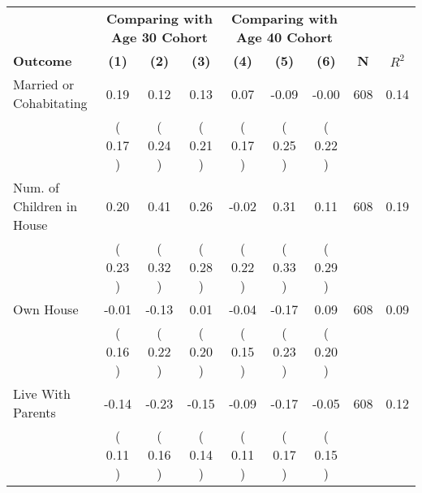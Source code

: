 \begin{tabular}{lcccccccc}
\toprule
 & \multicolumn{3}{c}{\textbf{Comparing with Age 30 Cohort}} & \multicolumn{3}{c}{\textbf{Comparing with Age 40 Cohort}} & \\
\cmidrule(lr){2-4} \cmidrule(lr){5-7} 
 \textbf{Outcome} & \textbf{(1)} & \textbf{(2)} & \textbf{(3)} & \textbf{(4)} & \textbf{(5)} & \textbf{(6)} & \textbf{N} & \textbf{$ R^2$} \\
\midrule
Married or Cohabitating &      0.19 &      0.12 &      0.13 &      0.07 &     -0.09 &     -0.00 & 608 &       0.14 \\ 
 & (     0.17 ) & (     0.24 ) & (     0.21 ) & (     0.17 ) & (     0.25 ) & (     0.22 ) & \\
Num. of Children in House &      0.20 &      0.41 &      0.26 &     -0.02 &      0.31 &      0.11 & 608 &       0.19 \\ 
 & (     0.23 ) & (     0.32 ) & (     0.28 ) & (     0.22 ) & (     0.33 ) & (     0.29 ) & \\
Own House &     -0.01 &     -0.13 &      0.01 &     -0.04 &     -0.17 &      0.09 & 608 &       0.09 \\ 
 & (     0.16 ) & (     0.22 ) & (     0.20 ) & (     0.15 ) & (     0.23 ) & (     0.20 ) & \\
Live With Parents &     -0.14 &     -0.23 &     -0.15 &     -0.09 &     -0.17 &     -0.05 & 608 &       0.12 \\ 
 & (     0.11 ) & (     0.16 ) & (     0.14 ) & (     0.11 ) & (     0.17 ) & (     0.15 ) & \\
\bottomrule
\end{tabular}
